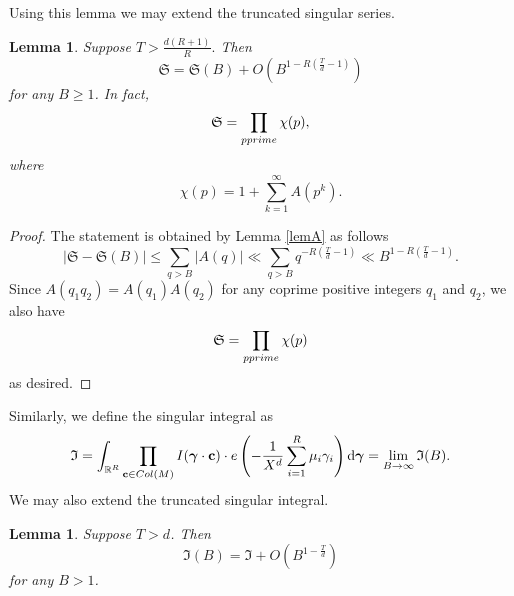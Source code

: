 \documentclass[reqno, 12pt, reqno]{amsart}
\numberwithin{equation}{section}
\newtheorem{lemma}[theorem]{Lemma}
\newcommand{\RR}{\mathbb{R}}
\renewcommand{\leq}{\leqslant}
\renewcommand{\geq}{\geqslant}
\renewcommand{\c}{\mathbf{c}}
\newcommand{\bgamma}{\boldsymbol{\gamma}}
\renewcommand{\=}{\equiv}
\begin{document}
Using this lemma we may extend the truncated singular series.
\begin{lemma}
\label{SSSS}
Suppose
$
T > \frac{d (R + 1)}{R}.
$
Then
$$
\mathfrak{S}  =  \mathfrak{S} (B) +  O( B^{1 - R (\frac{T}{d} - 1)})
$$
for any $B \geq 1$. In fact,
$$
\mathfrak{S} = \prod_{p \textnormal{ prime} } \chi(p),
$$
where
$$
\chi(p) = 1 + \sum_{k = 1}^{\infty} A (p^k).
$$
\end{lemma}

\begin{proof}
The statement is obtained by Lemma \ref{lemA} as follows
$$
| \mathfrak{S}   -  \mathfrak{S} (B)| \leq \sum_{q >  B} |A (q)| \ll \sum_{q >  B} q^{- R (\frac{T}{d} - 1)} \ll B^{1 - R (\frac{T}{d} - 1)}.
$$
Since $A (q_1 q_2) = A (q_1) A (q_2)$ for any coprime positive integers $q_1$ and $q_2$, we also have
$$
\mathfrak{S} = \prod_{p \textnormal{ prime} } \chi(p)
$$
as desired.
\end{proof}


Similarly, we define the singular integral as
\begin{eqnarray}
\label{singint}
\mathfrak{I} =  \int_{\RR^{R}}   \prod_{ \c \in \textnormal{Col}(M) } I(\bgamma \cdot \c)  \cdot  e \left(   -  \frac{1}{X^d} \sum_{i = 1}^{R} \mu_i \gamma_i \right)  \mathrm{d} \bgamma = \lim_{B \rightarrow \infty} \mathfrak I(B).
\end{eqnarray}
We may also extend the truncated singular integral.
\begin{lemma}\label{lem:singint}
Suppose $T > d$.
Then
\[
\mathfrak{I} (B) =  \mathfrak{I}  +    O(B^{1 - \frac{ T }{ d  } } )
\]
for any $B > 1$.
\end{lemma}
\end{document}
